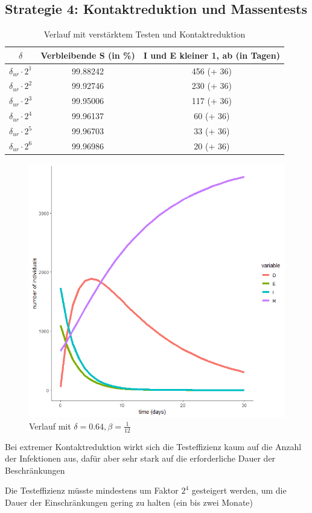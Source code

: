 \documentclass{scrartcl}
\begin{document}
\subsection{Strategie 4: Kontaktreduktion und Massentests}
	\begin{table}[h]
		\caption{Verlauf mit verstärktem Testen und Kontaktreduktion}
		\centering
		\begin{tabular}{@{}ccc@{}}
			\toprule
			$\delta$ & Verbleibende S (in \%) & I und E kleiner 1, ab  (in Tagen)\\ 
			\midrule
			 $\delta_{ur} \cdot 2^1$ & 99.88242 & 456 (+ 36) \\ 
			 $\delta_{ur} \cdot 2^2$ & 99.92746 & 230 (+ 36)\\  
			 $\delta_{ur} \cdot 2^3$ & 99.95006 & 117 (+ 36) \\ 
			 $\delta_{ur} \cdot 2^4$ & 99.96137 & 60 (+ 36)\\ 
			 $\delta_{ur} \cdot 2^5$ & 99.96703 & 33 (+ 36)\\ 
			 $\delta_{ur} \cdot 2^6$ & 99.96986 & 20 (+ 36)\\ 
			\bottomrule
		\end{tabular}
	\end{table}
	\begin{figure}[h]
        	\centering
		\includegraphics[scale=0.5]{delta=0,64,beta=1durch12,ohne_s.png}
		\caption{Verlauf mit $\delta = 0.64, \beta = \frac{1}{12}$}
	\end{figure}
	\begin{arrowlist}
		\item Bei extremer Kontaktreduktion wirkt sich die Testeffizienz kaum auf die Anzahl der Infektionen aus, dafür aber sehr stark auf die erforderliche Dauer der Beschränkungen
		\item Die Testeffizienz müsste mindestens um Faktor $2^4$ gesteigert werden, um die Dauer der Einschränkungen gering zu halten (ein bis zwei Monate)
	\end{arrowlist}
\end{document}
